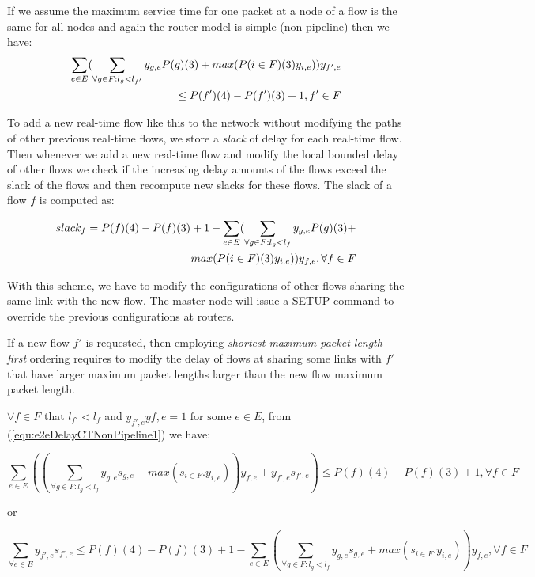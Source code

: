 \documentclass[conference, twocolumn]{IEEEtran}
\theoremstyle{definition}
\begin{document}
If we assume the maximum service time for one packet at a node of a flow is the same
for all nodes and again the router model is simple (non-pipeline) then we have:
\begin{eqnarray}\label{equ:e2eDelayNewPath2}
\sum_{e \in E} (\sum_{\forall g \in F:l_g <
l_{f'}}y_{g,e}P(g)(3)+max(P(i \in F)(3)y_{i,e}))y_{f',e} \notag \\
\leq P(f')(4)-P(f')(3) + 1, f' \in F 
\end{eqnarray}

To add a new real-time flow like this to the network without modifying the paths
of other previous real-time flows, we store a {\em slack} of delay for each
real-time flow. Then whenever we add a new real-time flow and modify the local
bounded delay of other flows we check if the increasing delay amounts of the
flows exceed the slack of the flows and then recompute new slacks for these
flows. The slack of a flow $f$ is computed as:

\begin{eqnarray}\label{equ:slack1}
	slack_f=P(f)(4)-P(f)(3) +
1 - \sum_{e \in E} (\sum_{\forall g \in F:l_g <
l_{f}}y_{g,e}P(g)(3)+ \notag \\
max(P(i \in F)(3)y_{i,e}))y_{f,e}, \forall f \in F
\end{eqnarray}

With this scheme, we have to modify the configurations of other flows sharing
the same link with the new flow. The master node will issue a SETUP command to
override the previous configurations at routers.

If a new flow $f'$ is requested, then employing {\em shortest maximum packet
length first} ordering requires to modify the delay of flows at sharing some
links with $f'$ that have larger maximum packet lengths larger than the new flow
maximum packet length. 

$\forall f \in F$  that $l_{f'} < l_f$ and $y_{f',e}y{f,e}=1 \mbox{ for some } e
\in E$, from (\ref{equ:e2eDelayCTNonPipeline1}) we have:

\begin{equation}\label{equ:e2eDelayModification}
\sum_{e \in E} \left(\left(\sum_{\forall g \in F:l_g <
l_{f}}y_{g,e}s_{g,e}+max(s_{i \in F}.y_{i,e})\right)y_{f,e}
+y_{f',e}s_{f',e}\right) 

\leq P(f)(4)-P(f)(3) + 1, \forall f \in F
\end{equation}

or

\begin{equation}\label{equ:e2eDelayModificatio2}
\sum_{\forall e \in E}y_{f',e}s_{f',e} \leq P(f)(4)-P(f)(3) + 1 - 

\sum_{e \in E}
\left(\sum_{\forall g \in F:l_g < l_f}y_{g,e}s_{g,e}+max(s_{i \in
F}.y_{i,e})\right)y_{f,e}, \forall f \in F
\end{equation}
\end{document}
